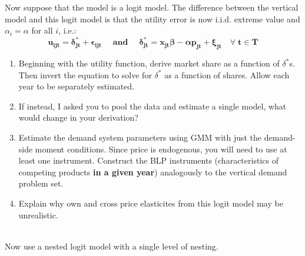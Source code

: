 \documentclass[12pt]{article}
\newcounter{mycounter} %
\begin{document}
\noindent
Now suppose that the model is a logit model. The difference between the vertical model and this logit model is that the utility error is now i.i.d. extreme value
and $\alpha _{i}=\alpha $ for all $i$, i.e.:
$$\boldsymbol{u_{ijt}=\delta _{jt}^{\ast }+\epsilon _{ijt} \quad \text{ and } \quad \delta
_{jt}^{\ast }=x_{jt}\beta -\alpha p_{jt}+\xi _{jt} \quad \forall \; t \in T}$$
\begin{enumerate}
\item Beginning with the utility function, derive market share as a function of \(\delta^*\)s. Then invert the equation to solve for \(\delta^*\) as a function of shares. Allow each year to be separately estimated.

\item If instead, I asked you to pool the data and estimate a single model, what would change in your derivation?


\item \label{est:logit} Estimate the demand system parameters using GMM with just the demand-side moment conditions. Since price is endogenous, you will need to use at least one instrument. Construct the BLP instruments (characteristics of competing products \textbf{in a given year}) analogously to the vertical demand problem set.

\item Explain why own and cross price elasticites from this logit model may be unrealistic.
\setcounter{mycounter}{\value{enumi}}
\end{enumerate}
\mbox{} \\
\noindent
Now use a nested logit model with a single level of nesting. 
\end{document}
